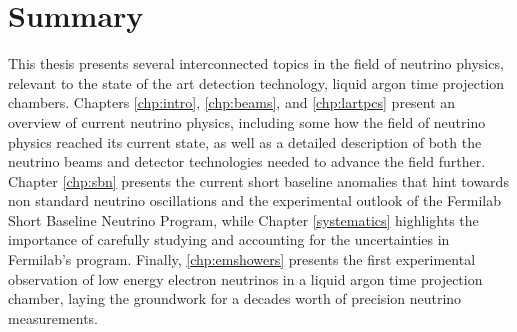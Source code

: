 \chapter{Summary}

This thesis presents several interconnected topics in the field of neutrino physics, relevant to the state of the art detection technology, liquid argon time projection chambers.  Chapters \ref{chp:intro}, \ref{chp:beams}, and \ref{chp:lartpcs} present an overview of current neutrino physics, including some how the field of neutrino physics reached its current state, as well as a detailed description of both the neutrino beams and detector technologies needed to advance the field further.  Chapter \ref{chp:sbn} presents the current short baseline anomalies that hint towards non standard neutrino oscillations and the experimental outlook of the Fermilab Short Baseline Neutrino Program, while Chapter \ref{systematics} highlights the importance of carefully studying and accounting for the uncertainties in Fermilab's program.  Finally, \ref{chp:emshowers} presents the first experimental observation of low energy electron neutrinos in a liquid argon time projection chamber, laying the groundwork for a decades worth of precision neutrino measurements.